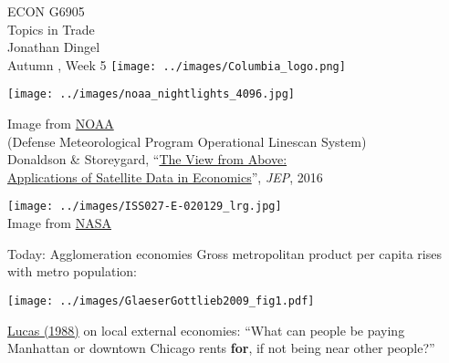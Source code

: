 \documentclass[11pt,notes=hide,aspectratio=169]{beamer}
\begin{document}
\begin{frame}[plain]
\begin{center}
\large
\textcolor{columbiadarkblue}{ECON G6905\\
Topics in Trade\\ 
Jonathan Dingel\\
Autumn \the\year, Week 5}
\vfill 
\texttt{[image: ../images/Columbia\_logo.png]}
\end{center}
\end{frame}
\begin{frame}[plain]
\begin{center}
\texttt{[image: ../images/noaa\_nightlights\_4096.jpg]} \\
{\small
Image from \href{ftp://public.sos.noaa.gov/land/earth_night/nightlights/4096.jpg}{NOAA} \\
(Defense Meteorological Program Operational Linescan System)\\
Donaldson \& Storeygard, ``\href{https://www.aeaweb.org/articles?id=10.1257/jep.30.4.171}{The View from Above: \\ Applications of Satellite Data in Economics}'', \textit{JEP}, 2016
\par}
\end{center}
\end{frame}
\begin{frame}[plain]
\begin{center}
\texttt{[image: ../images/ISS027-E-020129\_lrg.jpg]} \\
Image from \href{https://visibleearth.nasa.gov/view.php?id=50671
}{NASA}
\end{center}
\end{frame}
\begin{frame}{Today: Agglomeration economies}
Gross metropolitan product per capita rises with metro population:
\begin{center}
\texttt{[image: ../images/GlaeserGottlieb2009\_fig1.pdf]}
\end{center}
\href{https://www.sciencedirect.com/science/article/pii/0304393288901687}{Lucas (1988)} on local external economies:
``What can people be paying Manhattan or downtown Chicago rents \textbf{for}, if not being near other people?''
\end{frame}
\end{document}

